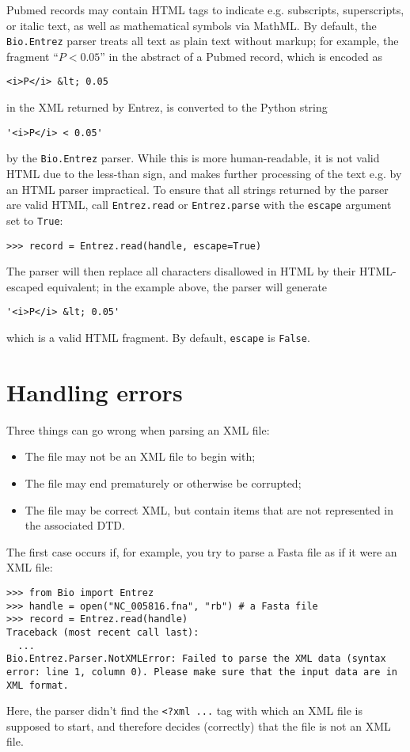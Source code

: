 Pubmed records may contain HTML tags to indicate e.g. subscripts, superscripts, or italic text, as well as mathematical symbols via MathML. By default, the \verb+Bio.Entrez+ parser treats all text as plain text without markup; for example, the fragment ``$P < 0.05$'' in the abstract of a Pubmed record, which is encoded as
\begin{verbatim}
<i>P</i> &lt; 0.05
\end{verbatim}
in the XML returned by Entrez, is converted to the Python string
\begin{verbatim}
'<i>P</i> < 0.05'
\end{verbatim}
by the \verb+Bio.Entrez+ parser. While this is more human-readable, it is not valid HTML due to the less-than sign, and makes further processing of the text e.g. by an HTML parser impractical. To ensure that all strings returned by the parser are valid HTML, call \verb+Entrez.read+ or \verb+Entrez.parse+ with the \verb+escape+ argument set to \verb+True+:
\begin{verbatim}
>>> record = Entrez.read(handle, escape=True)
\end{verbatim}
The parser will then replace all characters disallowed in HTML by their HTML-escaped equivalent; in the example above, the parser will generate
\begin{verbatim}
'<i>P</i> &lt; 0.05'
\end{verbatim}
which is a valid HTML fragment. By default, \verb+escape+ is \verb+False+.

\section{Handling errors}

Three things can go wrong when parsing an XML file:
\begin{itemize}
\item The file may not be an XML file to begin with;
\item The file may end prematurely or otherwise be corrupted;
\item The file may be correct XML, but contain items that are not represented in the associated DTD.
\end{itemize}

The first case occurs if, for example, you try to parse a Fasta file as if it were an XML file:

\begin{verbatim}
>>> from Bio import Entrez
>>> handle = open("NC_005816.fna", "rb") # a Fasta file
>>> record = Entrez.read(handle)
Traceback (most recent call last):
  ...
Bio.Entrez.Parser.NotXMLError: Failed to parse the XML data (syntax error: line 1, column 0). Please make sure that the input data are in XML format.
\end{verbatim}
Here, the parser didn't find the \verb|<?xml ...| tag with which an XML file is supposed to start, and therefore decides (correctly) that the file is not an XML file.

